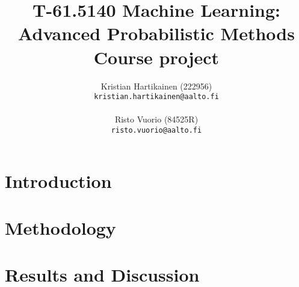 \documentclass[a4paper,10pt]{article}
\title{T-61.5140 Machine Learning: Advanced Probabilistic Methods \\ Course project}
\author{Kristian Hartikainen (222956)\\
         {\tt kristian.hartikainen@aalto.fi}\\
         \\
         Risto Vuorio (84525R)\\
         {\tt risto.vuorio@aalto.fi}}
\begin{document}
\maketitle

\pagebreak
\section{Introduction}


\section{Methodology}


\section{Results and Discussion}


\pagebreak
\end{document}
